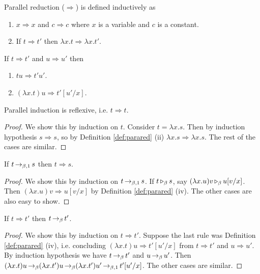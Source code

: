 \begin{boxdefi} \label{def:parared}
    \alert{Parallel reduction ($\Rightarrow$)} is defined inductively as
    \begin{enumerate}
        \item $x \Rightarrow x$ and $c \Rightarrow c$ where $x$ is a variable and $c$ is a constant.
        \item If $t \Rightarrow t'$ then $\lambda x.t \Rightarrow \lambda x. t'$.
    \end{enumerate}
    If $t \Rightarrow t'$ and $u \Rightarrow u'$ then 
    \begin{enumerate}[resume]
        \item $tu \Rightarrow t'u'$.
        \item $(\lambda x.t)u \Rightarrow t'[u'/x]$.
    \end{enumerate}
\end{boxdefi}

\begin{boxlem}
    Parallel induction is reflexive, i.e. $t \Rightarrow t$.
\end{boxlem}
\begin{proof}
    We show this by induction on $t$. 
    Consider $t = \lambda x.s$. 
    Then by induction hypothesis $s \Rightarrow s$, so by Definition \ref{def:parared} (ii) $\lambda x.s \Rightarrow \lambda x.s$.
    The rest of the cases are similar.
\end{proof}

\begin{boxlem} \label{lem:beoredtoarrow}
    If $t \operatorname{\to_{\beta, 1}} s$ then $t \Rightarrow s$.
\end{boxlem}
\begin{proof}
    We show this by induction on $t \operatorname{\to_{\beta, 1}} s$.
    If $t \operatorname{\triangleright_{\beta}} s$, say $(\lambda x.u)v \operatorname{\triangleright_{\beta}} u [v/x]$. 
    Then $(\lambda x. u)v \Rightarrow u [v/x]$ by Definition \ref{def:parared} (iv).
    The other cases are also easy to show.
\end{proof}

\begin{boxlem} \label{lem:arrowbered}
    If $t \Rightarrow t'$ then $t \operatorname{\to_{\beta}} t'$.
\end{boxlem}
\begin{proof}
    We show this by induction on $t \Rightarrow t'$.
    Suppose the last rule was Definition \ref{def:parared} (iv), i.e. concluding $(\lambda x.t)u \Rightarrow t'[u'/x]$ from $t \Rightarrow t'$ and $u \Rightarrow u'$.
    By induction hypothesis we have $t \operatorname{\to_{\beta}} t'$ and $u \operatorname{\to_{\beta}} u'$.
    Then $(\lambda x.t)u \operatorname{\to_{\beta}} (\lambda x.t') u \operatorname{\to_{\beta}} (\lambda x. t') u' \operatorname{\to_{\beta, 1}} t'[u'/x]$.
    The other cases are similar.
\end{proof}

